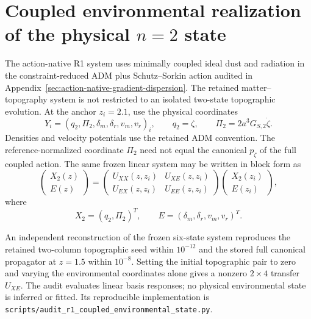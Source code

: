 
\section{Coupled environmental realization of the physical $n=2$ state}
\label{sec:coupled-environmental-state}

The action-native R1 system uses minimally coupled ideal dust and radiation
in the constraint-reduced ADM plus Schutz--Sorkin action audited in
Appendix~\ref{sec:action-native-gradient-dispersion}.
The retained matter--topography system is not restricted to an isolated
two-state topographic evolution.  At the anchor $z_i=2.1$, use the physical
coordinates
\begin{equation}
Y_i=
\left(
q_2,\Pi_2,
\delta_m,\delta_r,v_m,v_r
\right)_i ,
\qquad
q_2=\zeta,
\qquad
\Pi_2=2a^3G_{S,2}\dot\zeta .
\end{equation}
Densities and velocity potentials use the retained ADM convention.
The reference-normalized coordinate $\Pi_2$ need not equal the canonical
$p_\zeta$ of the full coupled action.
The same frozen linear system may be written in block form as
\begin{equation}
\begin{pmatrix}
X_2(z)\\
E(z)
\end{pmatrix}
=
\begin{pmatrix}
U_{XX}(z,z_i) & U_{XE}(z,z_i)\\
U_{EX}(z,z_i) & U_{EE}(z,z_i)
\end{pmatrix}
\begin{pmatrix}
X_2(z_i)\\
E(z_i)
\end{pmatrix},
\end{equation}
where
\begin{equation}
X_2=(q_2,\Pi_2)^T,
\qquad
E=(\delta_m,\delta_r,v_m,v_r)^T .
\end{equation}

An independent reconstruction of the frozen six-state system reproduces the
retained two-column topographic seed within $10^{-12}$ and the stored
full canonical propagator at $z=1.5$ within $10^{-8}$.  Setting the
initial topographic pair to zero and varying the environmental coordinates
alone gives a nonzero $2\times4$ transfer $U_{XE}$. The audit evaluates
linear basis responses; no physical environmental state is inferred or fitted.
Its reproducible implementation is
\texttt{scripts/audit\_r1\_coupled\_environmental\_state.py}.

